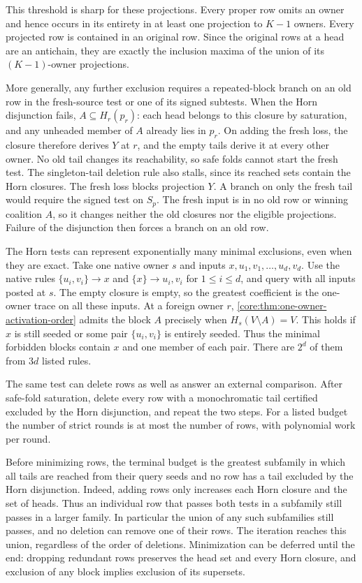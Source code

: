 This threshold is sharp for these projections.
Every proper row omits an owner and hence occurs
in its entirety in at least one projection to
$K-1$ owners. Every projected row is contained in
an original row. Since the original rows at a head
are an antichain, they are exactly the inclusion
maxima of the union of its $(K-1)$-owner projections.

More generally, any further exclusion requires a
repeated-block branch on an old row in the
fresh-source test or one of its signed subtests.
When the Horn disjunction fails, $A\subseteq H_r(p_r)$:
each head belongs to this closure by saturation, and
any unheaded member of $A$ already lies in $p_r$.
On adding the fresh loss, the closure therefore
derives $Y$ at $r$, and the empty tails derive it
at every other owner. No old tail changes its
reachability, so safe folds cannot start the fresh
test. The singleton-tail deletion rule also stalls,
since its reached sets contain the Horn closures.
The fresh loss blocks projection $Y$.
A branch on only the fresh tail would require the
signed test on $S_p$. The fresh input is in no
old row or winning coalition $A$, so it changes
neither the old closures nor the eligible projections.
Failure of the disjunction then forces a branch on
an old row.

The Horn tests can represent exponentially many minimal
exclusions, even when they are exact. Take one native owner
$s$ and inputs $x,u_1,v_1,\ldots,u_d,v_d$. Use the native
rules $\{u_i,v_i\}\to x$ and $\{x\}\to u_i,v_i$ for
$1\le i\le d$, and query with all inputs posted at $s$.
The empty closure is empty, so the greatest coefficient
is the one-owner trace on all these inputs. At a foreign
owner $r$, \cref{core:thm:one-owner-activation-order}
admits the block $A$ precisely when $H_s(V\setminus A)=V$.
This holds if $x$ is still seeded or some pair
$\{u_i,v_i\}$ is entirely seeded. Thus the minimal
forbidden blocks contain $x$ and one member of each
pair. There are $2^d$ of them from $3d$ listed rules.

The same test can delete rows as well as answer an
external comparison. After safe-fold saturation, delete
every row with a monochromatic tail certified excluded
by the Horn disjunction, and repeat the two steps.
For a listed budget the number of strict rounds is
at most the number of rows, with polynomial work per
round.

Before minimizing rows, the terminal budget is the
greatest subfamily in which all tails are reached
from their query seeds and no row has a tail excluded
by the Horn disjunction. Indeed, adding rows only
increases each Horn closure and the set of heads.
Thus an individual row that passes both tests in a
subfamily still passes in a larger family. In
particular the union of any such subfamilies still
passes, and no deletion can remove one of their
rows. The iteration reaches this union, regardless
of the order of deletions. Minimization can be
deferred until the end: dropping redundant rows
preserves the head set and every Horn closure,
and exclusion of any block implies exclusion of its
supersets.

